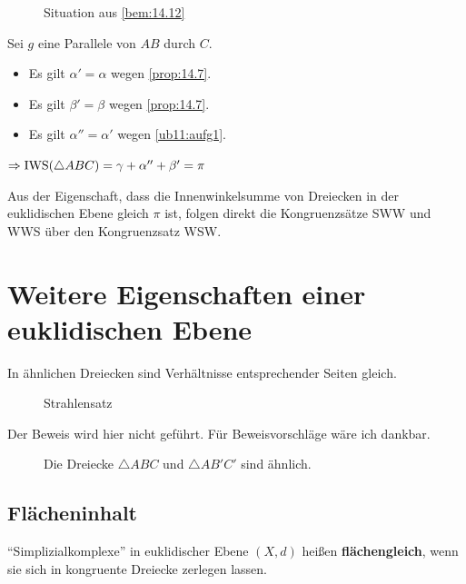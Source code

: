 \begin{figure}[htp]
    \centering
    
    \caption{Situation aus \cref{bem:14.12}}
    \label{fig:14.12}
\end{figure}

\begin{beweis}
    Sei $g$ eine Parallele von $AB$ durch $C$.

    \begin{itemize}
        \item Es gilt $\alpha' = \alpha$ wegen \cref{prop:14.7}.
        \item Es gilt $\beta' = \beta$ wegen \cref{prop:14.7}.
        \item Es gilt $\alpha'' = \alpha'$ wegen \cref{ub11:aufg1}.
    \end{itemize}
    $\Rightarrow \operatorname{IWS}(\triangle ABC) = \gamma + \alpha'' + \beta' = \pi$
\end{beweis}

Aus der Eigenschaft, dass die Innenwinkelsumme von Dreiecken in der euklidischen Ebene
gleich $\pi$ ist, folgen direkt die Kongruenzsätze SWW und WWS über den Kongruenzsatz
WSW.

\section{Weitere Eigenschaften einer euklidischen Ebene}
\begin{satz}[Strahlensatz]
    In ähnlichen Dreiecken sind Verhältnisse entsprechender Seiten gleich.
\end{satz}

\begin{figure}[htp]
    \centering
    
    \caption{Strahlensatz}
    \label{fig:hyperbolische-geometrie-2}
\end{figure}

Der Beweis wird hier nicht geführt. Für Beweisvorschläge wäre ich
dankbar.

\begin{figure}[htp]
    \centering
    
    \caption{Die Dreiecke $\triangle ABC$ und $\triangle AB'C'$ sind ähnlich.}
    \label{fig:triangle-similar}
\end{figure}

\subsection{Flächeninhalt}
\begin{definition}%
    \enquote{Simplizialkomplexe} in euklidischer Ebene $(X,d)$ heißen
    \textbf{flächengleich},
    wenn sie sich in kongruente Dreiecke zerlegen lassen.
\end{definition}


